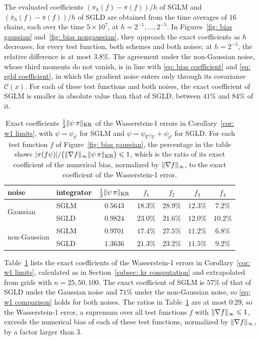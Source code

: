 The evaluated coefficients $(\pi_h(f) - \pi(f))/h$ of SGLM and $(\bar\pi_h(f) - \pi(f))/h$ of SGLD are obtained from the time averages of $16$ chains, each over the time $5 \times 10^7$, at $h = 2^{-1}, \dots, 2^{-5}$. In Figures~\ref{fig: bias gaussian} and~\ref{fig: bias nongaussian}, they approach the exact coefficients as $h$ decreases, for every test function, both schemes and both noises; at $h = 2^{-5}$, the relative difference is at most $3.8\%$. The agreement under the non-Gaussian noise, whose third moments do not vanish, is in line with \eqref{eq: bias coefficient} and \eqref{eq: sgld coefficient}, in which the gradient noise enters only through its covariance $\mathcal C(x)$. For each of these test functions and both noises, the exact coefficient of SGLM is smaller in absolute value than that of SGLD, between $41\%$ and $84\%$ of it.

\begin{table}[htb]
\centering
\small
\begin{tabular}{llccccc}
\toprule
noise & integrator & $\frac12 \lVert \psi\,\pi \rVert_{\mathrm{KR}}$ & $f_1$ & $f_2$ & $f_3$ & $f_4$ \\
\midrule
\multirow{2}{*}{Gaussian} & SGLM & $0.5643$ & $18.3\%$ & $28.9\%$ & $12.3\%$ & $7.2\%$ \\
 & SGLD & $0.9824$ & $23.0\%$ & $21.6\%$ & $12.0\%$ & $10.2\%$ \\
\midrule
\multirow{2}{*}{non-Gaussian} & SGLM & $0.9701$ & $17.4\%$ & $27.5\%$ & $11.2\%$ & $6.8\%$ \\
 & SGLD & $1.3636$ & $21.3\%$ & $23.2\%$ & $11.5\%$ & $9.2\%$ \\
\bottomrule
\end{tabular}
\caption{Exact coefficients $\frac12 \lVert \psi\,\pi \rVert_{\mathrm{KR}}$ of the Wasserstein-1 errors in Corollary~\ref{cor: w1 limits}, with $\psi = \psi_{\mathcal C}$ for SGLM and $\psi = \psi_{\nabla^2 U} + \psi_{\mathcal C}$ for SGLD. For each test function $f$ of Figure~\ref{fig: bias gaussian}, the percentage in the table shows $|\pi(f\psi)| / \bigl( \lVert \nabla f \rVert_\infty \lVert \psi\, \pi \rVert_{\mathrm{KR}} \bigr) \leqslant 1$, which is the ratio of its exact coefficient of the numerical bias, normalized by $\lVert \nabla f \rVert_\infty$, to the exact coefficient of the Wasserstein-1 error.}
\label{tab: w1 coefficients}
\end{table}

Table~\ref{tab: w1 coefficients} lists the exact coefficients of the Wasserstein-1 errors in Corollary~\ref{cor: w1 limits}, calculated as in Section~\ref{subsec: kr computation} and extrapolated from grids with $n = 25, 50, 100$. The exact coefficient of SGLM is $57\%$ of that of SGLD under the Gaussian noise and $71\%$ under the non-Gaussian noise, so \eqref{eq: w1 comparison} holds for both noises. The ratios in Table~\ref{tab: w1 coefficients} are at most $0.29$, so the Wasserstein-1 error, a supremum over all test functions $f$ with $\lVert \nabla f \rVert_\infty \leqslant 1$, exceeds the numerical bias of each of these test functions, normalized by $\lVert \nabla f \rVert_\infty$, by a factor larger than $3$.

